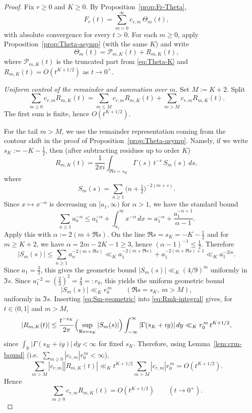 \documentclass[10pt,a4paper]{amsart}
\newcommand{\R}{\mathbb{R}}
\begin{document}
\begin{proof}
Fix $r\ge 0$ and $K\ge 0$. By Proposition~\ref{prop:Fr-Theta},
\[
F_r(t)=\sum_{m=0}^\infty c_{r,m}\,\Theta_m(t),
\]
with absolute convergence for every $t>0$. For each $m\ge0$, apply
Proposition~\ref{prop:Theta-asymp} (with the same $K$) and write
\[
\Theta_m(t)=\mathcal{P}_{m,K}(t)+R_{m,K}(t),
\]
where $\mathcal{P}_{m,K}(t)$ is the truncated part from \eqref{eq:Theta-K} and
$R_{m,K}(t)=O(t^{K+1/2})$ as $t\to0^+$.

\medskip
\noindent\emph{Uniform control of the remainder and summation over $m$.}
Set $M:=K+2$. Split
\[
\sum_{m\ge0}c_{r,m}R_{m,K}(t)=\sum_{m\le M}c_{r,m}R_{m,K}(t)+\sum_{m>M}c_{r,m}R_{m,K}(t).
\]
The first sum is finite, hence $O(t^{K+1/2})$.

For the tail $m>M$, we use the remainder representation coming from the contour shift
in the proof of Proposition~\ref{prop:Theta-asymp}. Namely, if we write
$s_K:=-K-\tfrac12$, then (after subtracting residues up to order $K$)
\begin{equation}\label{eq:Rmk-integral}
R_{m,K}(t)=\frac{1}{2\pi i}\int_{\Re s=s_K}\Gamma(s)\,t^{-s}\,S_m(s)\,ds,
\end{equation}
where
\[
S_m(s)=\sum_{n\ge1}\bigl(n+\tfrac12\bigr)^{-2(m+s)}.
\]
Since $x\mapsto x^{-\alpha}$ is decreasing on $[a_1,\infty)$ for $\alpha>1$, we have the standard bound
\[
\sum_{n\ge1} a_n^{-\alpha}
\le a_1^{-\alpha}+\int_{a_1}^{\infty}x^{-\alpha}\,dx
= a_1^{-\alpha}+\frac{a_1^{-\alpha+1}}{\alpha-1}.
\]
Apply this with $\alpha:=2(m+\Re s)$. On the line $\Re s=s_K=-K-\tfrac12$ and for $m\ge K+2$,
we have $\alpha=2m-2K-1\ge3$, hence $(\alpha-1)^{-1}\le \tfrac12$. Therefore
\[
|S_m(s)|
\le \sum_{n\ge1}a_n^{-2(m+\Re s)}
\ll_K a_1^{-2(m+\Re s)}+a_1^{-2(m+\Re s)+1}
\ll_K a_1^{-2m}.
\]
Since $a_1=\tfrac32$, this gives the geometric bound $|S_m(s)|\ll_K (4/9)^m$ uniformly in $\Im s$. Since $a_1^{-2}=(\tfrac23)^2=\tfrac49=:r_0$, this yields the uniform geometric bound
\begin{equation}\label{eq:Sm-geometric}
|S_m(s)|\ll_{K} r_0^{\,m}\qquad(\Re s=s_K,\ m>M),
\end{equation}
uniformly in $\Im s$. Inserting \eqref{eq:Sm-geometric} into \eqref{eq:Rmk-integral} gives, for
$t\in(0,1]$ and $m>M$,
\[
|R_{m,K}(t)|
\le \frac{t^{-s_K}}{2\pi}\Bigl(\sup_{\Re s=s_K}|S_m(s)|\Bigr)\int_{-\infty}^{\infty}|\Gamma(s_K+iy)|\,dy
\ll_{K} r_0^{\,m}\,t^{K+1/2},
\]
since $\int_{\R}|\Gamma(s_K+iy)|\,dy<\infty$ for fixed $s_K$.
Therefore, using Lemma~\ref{lem:crm-bound} (i.e.\ $\sum_{m\ge0}|c_{r,m}|r_0^{\,m}<\infty$),
\[
\sum_{m>M}|c_{r,m}||R_{m,K}(t)| \ll_K t^{K+1/2}\sum_{m>M}|c_{r,m}|r_0^{\,m}
=O(t^{K+1/2}).
\]
Hence
\[
\sum_{m\ge0}c_{r,m}R_{m,K}(t)=O(t^{K+1/2})\qquad(t\to0^+).
\]


\end{proof}
\end{document}
